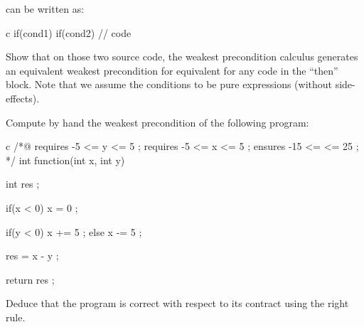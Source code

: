 can be written as:



\begin{CodeBlock}{c}
if(cond1){
  if(cond2){    
    // code
  }
}
\end{CodeBlock}



Show that on those two source code, the weakest precondition calculus
generates an equivalent weakest precondition for equivalent for any code
in the ``then'' block. Note that we assume the conditions to be pure
expressions (without side-effects).





Compute by hand the weakest precondition of the following program:


\begin{CodeBlock}{c}
/*@ 
  requires -5 <= y <= 5 ; 
  requires -5 <= x <= 5 ; 
  ensures  -15 <= \result <= 25 ;
*/
int function(int x, int y){
  int res ;

  if(x < 0){
    x = 0 ;
  }
  
  if(y < 0){
    x += 5 ;
  } else {
    x -= 5 ;
  }
  
  res = x - y ;

  return res ;
}
\end{CodeBlock}


Deduce that the program is correct with respect to its contract using the
right rule.
